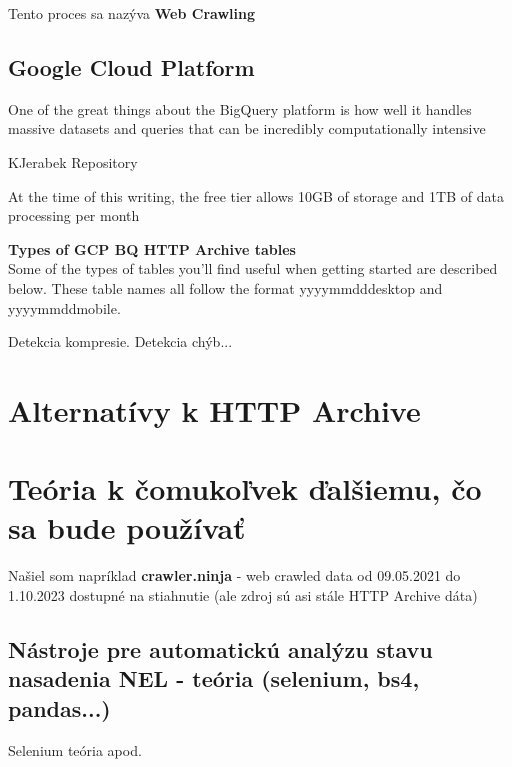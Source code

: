Tento proces sa nazýva \textbf{Web Crawling}

\subsection{Google Cloud Platform}

One of the great things about the BigQuery platform is how well it handles massive datasets and queries that can be incredibly computationally intensive

KJerabek Repository

At the time of this writing, the free tier allows 10GB of storage and 1TB of data processing per month

\textbf{Types of GCP BQ HTTP Archive tables}
\\
Some of the types of tables you'll find useful when getting started are described below. These table names all follow the format yyyy\textunderscore mm\textunderscore dd\textunderscore desktop and yyyy\textunderscore mm\textunderscore dd\textunderscore mobile.

Detekcia kompresie. Detekcia chýb...

\section{Alternatívy k HTTP Archive}

\section{Teória k čomukoľvek ďalšiemu, čo sa bude používať}

Našiel som napríklad \textbf{crawler.ninja} - web crawled data od 09.05.2021 do 1.10.2023 dostupné na stiahnutie (ale zdroj sú asi stále HTTP Archive dáta)

\subsection{Nástroje pre automatickú analýzu stavu nasadenia NEL - teória (selenium, bs4, pandas...)}

Selenium teória apod.
